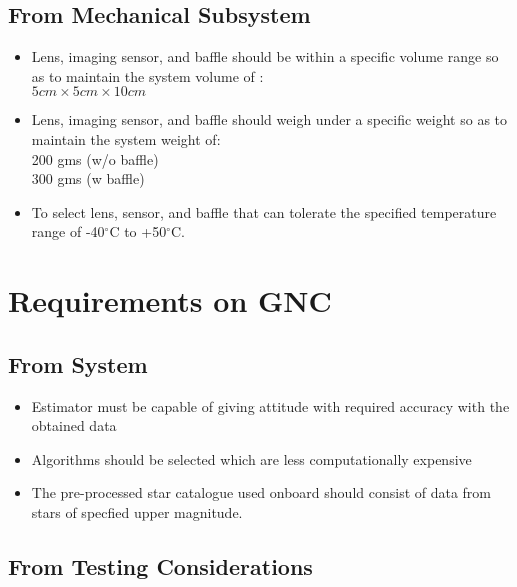 \documentclass[../../main.tex]{subfiles}
\begin{document}
\subsection{From Mechanical Subsystem}
\begin{itemize}
    \item Lens, imaging sensor, and baffle should be within a specific volume range so as to maintain the system volume of : \\$5cm\times5cm\times10cm$ %
    \item Lens, imaging sensor, and baffle should weigh under a specific weight so as to maintain the system weight of:\\200 gms (w/o baffle)\\300 gms (w baffle)
    \item To select lens, sensor, and baffle that can tolerate the specified temperature range of -40$^\circ$C to +50$^\circ$C. 
\end{itemize}


\newpage
\section{Requirements on GNC}
\subsection{From System}
\begin{itemize}
    \item Estimator must be capable of giving attitude with required accuracy with the obtained data
    \item Algorithms should be selected which are less computationally expensive
    \item The pre-processed star catalogue used onboard should consist of data from stars of specfied upper magnitude.
\end{itemize}
\subsection{From Testing Considerations}
\end{document}
